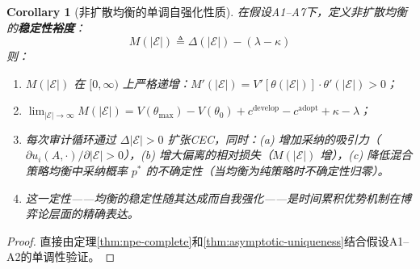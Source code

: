 \documentclass[12pt,a4paper]{ctexart}
\newtheorem{corollary}[theorem]{Corollary}
\theoremstyle{definition}
\theoremstyle{remark}
\begin{document}
\begin{corollary}[非扩散均衡的单调自强化性质]
\label{cor:self-reinforcing}
在假设A1--A7下，定义非扩散均衡的\textbf{稳定性裕度}：
\begin{equation}
M(|\mathcal{E}|) \triangleq \Delta(|\mathcal{E}|) - (\lambda - \kappa)
\end{equation}
则：
\begin{enumerate}[label=(\roman*)]
\item $M(|\mathcal{E}|)$ 在 $[0, \infty)$ 上严格递增：$M'(|\mathcal{E}|) = V'[\theta(|\mathcal{E}|)] \cdot \theta'(|\mathcal{E}|) > 0$；
\item $\lim_{|\mathcal{E}| \to \infty} M(|\mathcal{E}|) = V(\theta_{\max}) - V(\theta_0) + c^{\text{develop}} - c^{\text{adopt}} + \kappa - \lambda$；
\item 每次审计循环通过 $\Delta |\mathcal{E}| > 0$ 扩张CEC，同时：(a) 增加采纳的吸引力（$\partial u_i(A, \cdot) / \partial |\mathcal{E}| > 0$），(b) 增大偏离的相对损失（$M(|\mathcal{E}|)$ 增），(c) 降低混合策略均衡中采纳概率 $p^*$ 的不确定性（当均衡为纯策略时不确定性归零）。
\item 这一定性——均衡的稳定性随其达成而自我强化——是\textit{时间累积优势}机制在博弈论层面的精确表达。
\end{enumerate}
\end{corollary}

\begin{proof}
直接由定理\ref{thm:npe-complete}和\ref{thm:asymptotic-uniqueness}结合假设A1--A2的单调性验证。
\end{proof}
\end{document}
